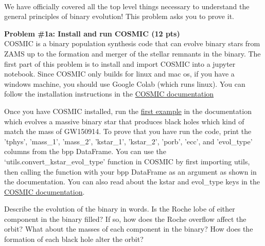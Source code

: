 \documentclass[11pt, a4paper]{article}
\newcommand\dunderline[3][-1pt]{{%
  \sbox0{#3}%
  \ooalign{\copy0\cr\rule[\dimexpr#1-#2\relax]{\wd0}{#2}}}}
\begin{document}
 

\normalfont


  
\noindent \dunderline{1.0pt}{\textbf{Problem \#1: Binary Evolution (36
points)}}\\
We have officially covered all the top level things necessary to understand the
general principles of binary evolution! This problem asks you to prove it.
\vspace{8pt}

\noindent \textbf{Problem \#1a: Install and run COSMIC (12 pts)}\\
\noindent COSMIC is a binary population synthesis code that can evolve binary
stars from ZAMS up to the formation and merger of the stellar remnants in the
binary. The first part of this problem is to install and import COSMIC into a
jupyter notebook. Since COSMIC only builds for linux and mac os, if you have a
windows machine, you should use Google Colab (which runs linux). You can follow
the installation instructions in the
\href{https://cosmic-popsynth.github.io/COSMIC/install/index.html}{COSMIC
documentation}
\vspace{4pt}

\noindent Once you have COSMIC installed, run the
\href{https://cosmic-popsynth.github.io/COSMIC/examples/index.html}{first
example} in the documentation which evolves a massive binary star that produces
black holes which kind of match the mass of GW150914. To prove that you have run
the code, print the 'tphys', 'mass\_1', 'mass\_2', 'kstar\_1', 'kstar\_2',
'porb', 'ecc', and 'evol\_type' columns from the bpp DataFrame. You can use the
`utils.convert\_kstar\_evol\_type' function in COSMIC by first importing utils,
then calling the function with your bpp DataFrame as an argument as shown in the
documentation. You can also read about the kstar and evol\_type keys in the
\href{https://cosmic-popsynth.github.io/COSMIC/output_info/index.html}{COSMIC
documentation}.

\vspace{4pt} 

\noindent Describe the evolution of the binary in words. Is the Roche lobe of
either component in the binary filled? If so, how does the Roche overflow affect
the orbit? What about the masses of each component in the binary? How does the
formation of each black hole alter the orbit?
\vspace{8pt}
\end{document}
